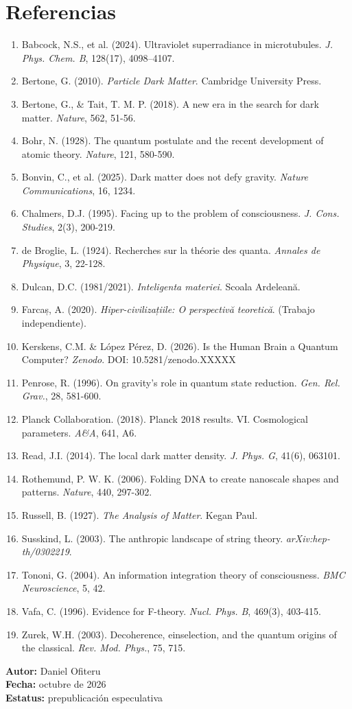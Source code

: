 \documentclass[11pt,a4paper]{article}
\begin{document}
\section*{Referencias}
\begin{enumerate}
    \item Babcock, N.S., et al. (2024). Ultraviolet superradiance in microtubules. \textit{J. Phys. Chem. B}, 128(17), 4098--4107.
    \item Bertone, G. (2010). \textit{Particle Dark Matter}. Cambridge University Press.
    \item Bertone, G., \& Tait, T. M. P. (2018). A new era in the search for dark matter. \textit{Nature}, 562, 51-56.
    \item Bohr, N. (1928). The quantum postulate and the recent development of atomic theory. \textit{Nature}, 121, 580-590.
    \item Bonvin, C., et al. (2025). Dark matter does not defy gravity. \textit{Nature Communications}, 16, 1234.
    \item Chalmers, D.J. (1995). Facing up to the problem of consciousness. \textit{J. Cons. Studies}, 2(3), 200-219.
    \item de Broglie, L. (1924). Recherches sur la théorie des quanta. \textit{Annales de Physique}, 3, 22-128.
    \item Dulcan, D.C. (1981/2021). \textit{Inteligenta materiei}. Scoala Ardeleană.
    \item Farcaș, A. (2020). \textit{Hiper-civilizațiile: O perspectivă teoretică}. (Trabajo independiente).
    \item Kerskens, C.M. \& López Pérez, D. (2026). Is the Human Brain a Quantum Computer? \textit{Zenodo}. DOI: 10.5281/zenodo.XXXXX
    \item Penrose, R. (1996). On gravity's role in quantum state reduction. \textit{Gen. Rel. Grav.}, 28, 581-600.
    \item Planck Collaboration. (2018). Planck 2018 results. VI. Cosmological parameters. \textit{A\&A}, 641, A6.
    \item Read, J.I. (2014). The local dark matter density. \textit{J. Phys. G}, 41(6), 063101.
    \item Rothemund, P. W. K. (2006). Folding DNA to create nanoscale shapes and patterns. \textit{Nature}, 440, 297-302.
    \item Russell, B. (1927). \textit{The Analysis of Matter}. Kegan Paul.
    \item Susskind, L. (2003). The anthropic landscape of string theory. \textit{arXiv:hep-th/0302219}.
    \item Tononi, G. (2004). An information integration theory of consciousness. \textit{BMC Neuroscience}, 5, 42.
    \item Vafa, C. (1996). Evidence for F-theory. \textit{Nucl. Phys. B}, 469(3), 403-415.
    \item Zurek, W.H. (2003). Decoherence, einselection, and the quantum origins of the classical. \textit{Rev. Mod. Phys.}, 75, 715.
\end{enumerate}

\vspace{1cm}
\begin{flushright}
\textbf{Autor:} Daniel Ofiteru \\
\textbf{Fecha:} octubre de 2026 \\
\textbf{Estatus:} prepublicación especulativa
\end{flushright}
\end{document}
